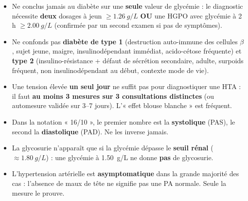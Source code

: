\documentclass[11pt]{article}
\newcounter{popsec}
\newcounter{popsub}
\newcommand{\courssub}[1]{%
  \stepcounter{popsub}%
  \par\vspace{9pt}\noindent{\popxbold\fontsize{11.5}{13}\selectfont\color{popink}{\color{poporange}\thepopsec.\thepopsub}\hspace{6pt}#1}\par\nopagebreak\vspace{4pt}
}
\begin{document}
\begin{attention}
\begin{itemize}
\item Ne conclus jamais au diabète sur une \textbf{seule} valeur de glycémie : le diagnostic nécessite \textbf{deux} dosages à jeun $\geq \SI{1,26}{g/L}$ \textbf{OU} une HGPO avec glycémie à 2 h $\geq \SI{2,00}{g/L}$ (confirmée par un second examen si pas de symptômes).
\item Ne confonds pas \textbf{diabète de type 1} (destruction auto-immune des cellules $\beta$, sujet jeune, maigre, insulinodépendant immédiat, acido-cétose fréquente) et \textbf{type 2} (insulino-résistance + défaut de sécrétion secondaire, adulte, surpoids fréquent, non insulinodépendant au début, contexte mode de vie).
\item Une tension élevée \textbf{un seul jour} ne suffit pas pour diagnostiquer une HTA : il faut \textbf{au moins 3 mesures sur 3 consultations distinctes} (ou automesure validée sur 3--7 jours). L'« effet blouse blanche » est fréquent.
\item Dans la notation « 16/10 », le premier nombre est la \textbf{systolique} (PAS), le second la \textbf{diastolique} (PAD). Ne les inverse jamais.
\item La glycosurie n'apparaît que si la glycémie dépasse le \textbf{seuil rénal} ($\approx \SI{1,80}{g/L}$) : une glycémie à \SI{1,50}{g/L} ne donne \textbf{pas} de glycosurie.
\item L'hypertension artérielle est \textbf{asymptomatique} dans la grande majorité des cas : l'absence de maux de tête ne signifie pas une PA normale. Seule la mesure le prouve.
\end{itemize}
\end{attention}

\courssub{Bilan de l'activité}
\end{document}

